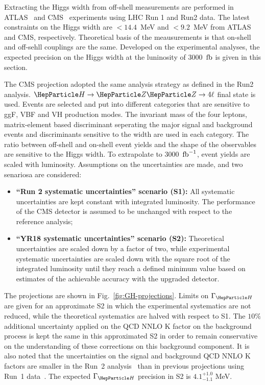 
\newcommand{\GH}{\ensuremath{\Gamma_{\PH}}\xspace}

Extracting the Higgs width from off-shell measurements are performed in ATLAS~\cite{Aaboud:2018puo} and CMS~\cite{CMS:2018bwq} experiments using LHC Run 1 and Run2 data. The latest constraints on the Higgs width are $< 14.4$~MeV and $<9.2$~MeV from ATLAS and CMS, respectively. Theoretical basis of the meausurements is that on-shell and off-sehll couplings are the same. Developed on the experimental analyses, the expected precision on the Higgs width at the luninosity of 3000 ${\,{\rm fb}}$ is given in this section.  

The CMS projection adopted the same analysis strategy as defined in the Run2 analysis. $\PH\to\PZ\PZ\to4\ell$ final state is used. Events are selected and put into different categories that are sensitive to ggF, VBF and VH production modes. The invariant mass of the four leptons, matrix-element based discriminant seperating the major signal and background events and discriminants sensitive to the width are used in each category. The ratio between off-shell and on-shell event yields and the shape of the observables are sensitive to the Higgs width. To extrapolate to 3000 $\,{\rm fb}^{-1}$, event yields are scaled with luminosity. Assumptions on the uncertainties are made, and two senariosa are considered:
\begin{itemize}
\item {\bf ``Run 2 systematic uncertainties'' scenario (S1):} All systematic uncertainties are kept constant with
  integrated luminosity. The performance of the CMS detector is
  assumed to be unchanged with respect to the reference analysis;

\item {\bf ``YR18 systematic uncertainties'' scenario (S2):} Theoretical uncertainties are scaled down by a factor of two,
  while experimental systematic uncertainties are scaled down with the
  square root of the integrated luminosity until they reach a defined
  minimum value based on estimates of the achievable accuracy with the
  upgraded detector.
\end{itemize} 

The projections are shown in Fig.~\ref{fig:GH-projections}. Limits on \GH are given for an approximate S2 in which the experimental systematics are not reduced, while the theoretical systematics are halved with respect to S1. The $10\%$ additional uncertainty applied on the QCD NNLO K factor on the \glufu background process is kept the same in this approximated S2 in order to remain conservative on the understanding of these corrections on this background component. It is also noted that the uncertainties on the signal and background QCD NNLO K factors are smaller in the Run~2 analysis~\cite{CMS:2018bwq} than in previous projections using Run~1 data~\cite{ATL-PHYS-PUB-2015-024}. The expected \GH precision in S2 is $4.1 ^{+1.0}_{-1.1}$ MeV. 

